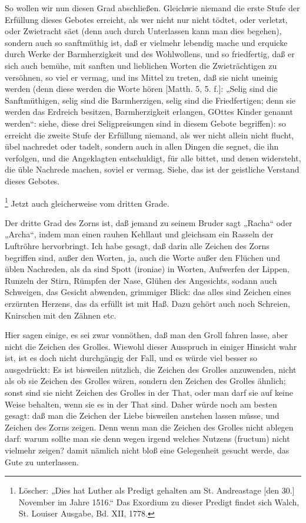 So wollen wir nun diesen Grad abschließen. Gleichwie niemand die erste Stufe der Erfüllung dieses Gebotes erreicht, als wer nicht nur nicht tödtet, oder verletzt, oder Zwietracht säet (denn auch durch Unterlassen kann man dies begehen), sondern auch so sanftmüthig ist, daß er vielmehr lebendig mache und erquicke durch Werke der Barmherzigkeit und des Wohlwollens, und so friedfertig, daß er sich auch bemühe, mit sanften und lieblichen Worten die Zwieträchtigen zu versöhnen, so viel er vermag, und ins Mittel zu treten, daß sie nicht uneinig werden (denn diese werden die Worte hören [Matth. 5, 5. f.]: „Selig sind die Sanftmüthigen, selig sind die Barmherzigen, selig sind die Friedfertigen; denn sie werden das Erdreich besitzen, Barmherzigkeit erlangen, GOttes Kinder genannt werden“: siehe, diese drei Seligpreisungen sind in diesem Gebote begriffen): so erreicht die zweite Stufe der Erfüllung niemand, als wer nicht allein nicht flucht, übel nachredet oder tadelt, sondern auch in allen Dingen die segnet, die ihn verfolgen, und die Angeklagten entschuldigt, für alle bittet, und denen widersteht, die üble Nachrede machen, soviel er vermag. Siehe, das ist der geistliche Verstand dieses Gebotes.

\footnote{Löscher: „Dies hat Luther als Predigt gehalten am St. Andreastage [den 30.] November im Jahre 1516.“ Das Exordium zu dieser Predigt findet sich Walch, St. Louiser Ausgabe, Bd. XII, 1778.} Jetzt auch gleicherweise vom dritten Grade.

Der dritte Grad des Zorns ist, daß jemand zu seinem Bruder sagt „Racha“ oder „Archa“, indem man einen rauhen Kehllaut und gleichsam ein Rasseln der Luftröhre hervorbringt. Ich habe gesagt, daß darin alle Zeichen des Zorns begriffen sind, außer den Worten, ja, auch die Worte außer den Flüchen und üblen Nachreden, als da sind Spott (ironiae) in Worten, Aufwerfen der Lippen, Runzeln der Stirn, Rümpfen der Nase, Glühen des Angesichts, sodann auch Schweigen, das Gesicht abwenden, grimmiger Blick: das alles sind Zeichen eines erzürnten Herzens, das da erfüllt ist mit Haß. Dazu gehört auch noch Schreien, Knirschen mit den Zähnen etc.

Hier sagen einige, es sei zwar vonnöthen, daß man den Groll fahren lasse, aber nicht die Zeichen des Grolles. Wiewohl dieser Ausspruch in einiger Hinsicht wahr ist, ist es doch nicht durchgängig der Fall, und es würde viel besser so ausgedrückt: Es ist bisweilen nützlich, die Zeichen des Grolles anzuwenden, nicht als ob sie Zeichen des Grolles wären, sondern den Zeichen des Grolles ähnlich; sonst sind sie nicht Zeichen des Grolles in der That, oder man darf sie auf keine Weise behalten, wenn sie es in der That sind. Daher würde noch am besten gesagt: daß man die Zeichen der Liebe bisweilen anstehen lassen müsse, und Zeichen des Zorns zeigen. Denn wenn man die Zeichen des Grolles nicht ablegen darf: warum sollte man sie denn wegen irgend welches Nutzens (fructum) nicht vielmehr zeigen? damit nämlich nicht bloß eine Gelegenheit gesucht werde, das Gute zu unterlassen.

